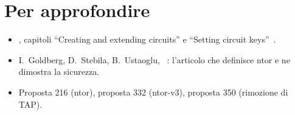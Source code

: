 \section*{Per approfondire}
\begin{itemize}
  \item {}, capitoli \enquote{Creating and extending circuits} e \enquote{Setting circuit keys}~\cite{torspec}.
  \item I.~Goldberg, D.~Stebila, B.~Ustaoglu, ~\cite{goldberg2013ntor}: l'articolo che definisce ntor e ne dimostra la sicurezza.
  \item Proposta 216 (ntor), proposta 332 (ntor-v3), proposta 350 (rimozione di TAP).
\end{itemize}
